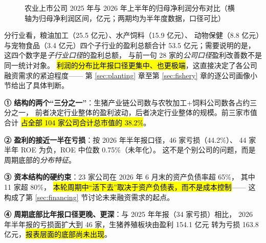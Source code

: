 \begin{figure}[htbp]
\centering
{}
\caption{农业上市公司 2025 年与 2026 年上半年的归母净利润分布对比（横轴为归母净利润区间，亿元；两期均为半年度数据，口径可比）}
\label{fig:comp-h1-dist}
\end{figure}

分行业看，粮油加工（\num{25.5} 亿元）、水产饲料（\num{15.9} 亿元）、
动物保健（\num{8.8} 亿元）与宠物食品（\num{3.4} 亿元）四个子行业的盈利总额合计
\num{53.5} 亿元；需要说明的是，这四个数字是\emph{子行业口径}的盈利总额，
与前一句 \num{28} 家的\emph{公司口径}盈利改善数不是同一统计对象。
\hl{利润的分布比年报口径更集中、也更极端}，这直接决定了各公司融资需求的紧迫程度——
第 \ref{sec:planting} 章至第 \ref{sec:fishery} 章的逐公司画像小节给出了具体判断。

\begin{keybox}[第二部分的四条主线]
\normalsize
\textbf{① 结构的两个“三分之一”}：生猪产业链公司数与农牧加工+饲料公司数各占约三分之一，
前者决定行业整体的盈利波动，后者决定行业整体的规模。前三家市值合计
\hl{占全部 \num{104} 家公司合计总市值的 \num{38.2}\%}。\par\vspace{3pt}
\textbf{② 盈利的接近一半在亏损}：按 2026 年半年报口径，\num{46} 家亏损（\num{44.2}\%）、
\num{44} 家半年 ROE 为负，ROE 中位数 \num{0.75}\%（未年化）。
这不是个别公司的问题，而是周期底部的\emph{分布特征}。\par\vspace{3pt}
\textbf{③ 资本结构的硬约束}：\num{23} 家公司在 2026 年 6 月末的资产负债率超 \num{65}\%，
其中 \num{11} 家超 \num{80}\%，
\hl{本轮周期中“活下去”取决于资产负债表，而不是成本控制}——
这构成了第 \ref{sec:financing} 节讨论未来融资需求的起点。\par\vspace{3pt}
\textbf{④ 周期底部比年报口径更晚、更深}：与 2025 年年报（\num{34} 家亏损）相比，
2026 年半年报的亏损面扩大到 \num{46} 家，生猪养殖板块由盈利 \num{154.1} 亿元
转为亏损 \num{163.8} 亿元，\hl{报表层面的底部尚未出现}。
\end{keybox}
